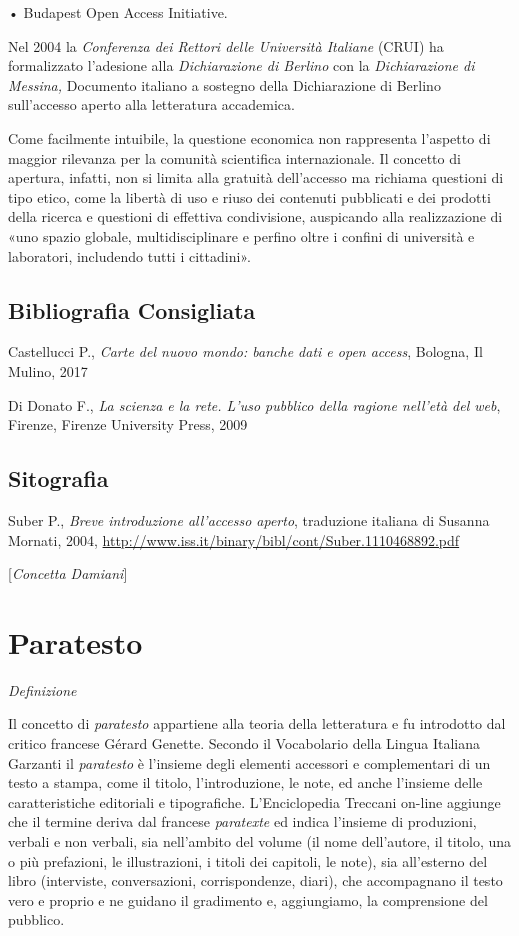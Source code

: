 {• Budapest Open Access Initiative.

Nel 2004 la \emph{Conferenza dei Rettori delle Università Italiane}
(CRUI) ha formalizzato l'adesione alla \emph{Dichiarazione di Berlino}
con la \emph{Dichiarazione di Messina,} Documento italiano a sostegno
della Dichiarazione di Berlino sull'accesso aperto alla letteratura
accademica.

Come facilmente intuibile, la questione economica non rappresenta
l'aspetto di maggior rilevanza per la comunità scientifica
internazionale. Il concetto di apertura, infatti, non si limita alla
gratuità dell'accesso ma richiama questioni di tipo etico, come la
libertà di uso e riuso dei contenuti pubblicati e dei prodotti della
ricerca e questioni di effettiva condivisione, auspicando alla
realizzazione di «uno spazio globale, multidisciplinare e perfino oltre
i confini di università e laboratori, includendo tutti i cittadini».

\section*{Bibliografia Consigliata}
{\parindent0pt 
Castellucci P., \emph{Carte del nuovo mondo: banche dati e open access},
Bologna, Il Mulino, 2017

Di Donato F., \emph{La scienza e la rete. L'uso pubblico della ragione
nell'età del web}, Firenze, Firenze University Press, 2009
}

\section*{Sitografia}
{\parindent0pt 
Suber P., \emph{Breve introduzione all'accesso aperto}, traduzione
italiana di Susanna Mornati, 2004,
\url{http://www.iss.it/binary/bibl/cont/Suber.1110468892.pdf}

}

\hrulefill 
 
{[}\emph{Concetta Damiani}{]}




\chapter{Paratesto}

\emph{Definizione}

Il concetto di \emph{paratesto} appartiene alla teoria della letteratura
e fu introdotto dal critico francese Gérard Genette. Secondo il
Vocabolario della Lingua Italiana Garzanti il \emph{paratesto} è
l'insieme degli elementi accessori e complementari di un testo a stampa,
come il titolo, l'introduzione, le note, ed anche l'insieme delle
caratteristiche editoriali e tipografiche. L'Enciclopedia Treccani
on-line aggiunge che il termine deriva dal francese \emph{paratexte} ed
indica l'insieme di produzioni, verbali e non verbali, sia nell'ambito
del volume (il nome dell'autore, il titolo, una o più prefazioni, le
illustrazioni, i titoli dei capitoli, le note), sia all'esterno del
libro (interviste, conversazioni, corrispondenze, diari), che
accompagnano il testo vero e proprio e ne guidano il gradimento e,
aggiungiamo, la comprensione del pubblico.

}
